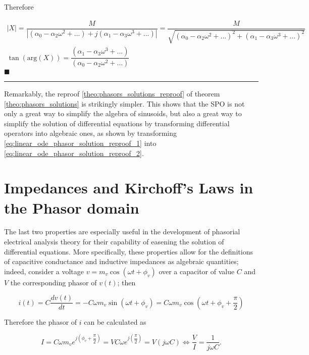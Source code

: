	Therefore

\begin{gather}
	\left\lvert X\right\rvert = \dfrac{M}{\left\lvert\left(\alpha_0 - \alpha_2\omega^2 + ...\right) + j\left(\alpha_1 - \alpha_3\omega^3 + ...\right)\right\rvert} = \dfrac{M}{\sqrt{\left(\alpha_0 - \alpha_2\omega^2 + ...\right)^2 + \left(\alpha_1 - \alpha_3\omega^3 + ...\right)^2}} \\[3mm]
	\tan\left(\text{arg}\left(X\right)\right) = \dfrac{\left(\alpha_1 - \alpha_3\omega^3 + ...\right)}{\left(\alpha_0 - \alpha_2\omega^2 + ...\right)}
\end{gather}
\hfill$\blacksquare$
\vspace{5mm}
\hrule
\vspace{5mm}

	Remarkably, the reproof \ref{theo:phasors_solutions_reproof} of theorem \ref{theo:phasors_solutions} is strikingly simpler. This shows that the SPO is not only a great way to simplify the algebra of sinusoids, but also a great way to simplify the solution of differential equations by transforming differential operators into algebraic ones, as shown by transforming \eqref{eq:linear_ode_phasor_solution_reproof_1} into \eqref{eq:linear_ode_phasor_solution_reproof_2}.

\section{Impedances and Kirchoff's Laws in the Phasor domain} %

	The last two properties are especially useful in the development of phasorial electrical analysis theory for their capability of easening the solution of differential equations. More specifically, these properties allow for the definitions of capacitive conductance and inductive impedances as algebraic quantities; indeed, consider a voltage $v = m_v\cos\left(\omega t + \phi_v\right)$ over a capacitor of value $C$ and $V$ the corresponding phasor of $v(t)$; then

\begin{equation} i(t) = C\dfrac{dv(t)}{dt} = -C\omega m_v \sin\left(\omega t + \phi_v\right) = C\omega m_v\cos\left(\omega t + \phi_v + \dfrac{\pi}{2}\right) \end{equation}

	Therefore the phasor of $i$ can be calculated as

\begin{equation} I = C\omega m_ve^{\displaystyle j\left(\phi_v + \dfrac{\pi}{2}\right)} = V C\omega e^{\displaystyle j\left(\dfrac{\pi}{2}\right)} = V \left(j\omega C\right) \Leftrightarrow \dfrac{V}{I} = \dfrac{1}{j\omega C}. \end{equation}

